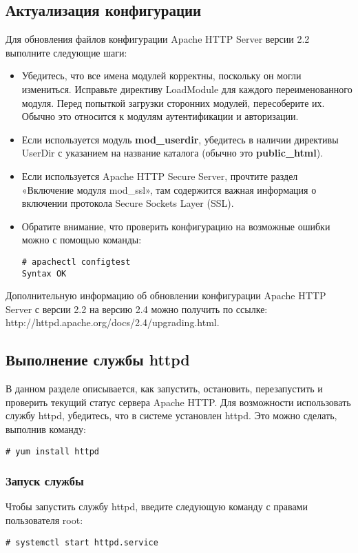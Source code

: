 \documentclass[a4paper,10pt,twoside]{article}
\begin{document}
\subsection{Актуализация конфигурации}
Для обновления файлов конфигурации Apache HTTP Server версии 2.2 выполните следующие шаги:
\begin{itemize}
 \item Убедитесь, что все имена модулей корректны, поскольку он могли измениться. Исправьте директиву LoadModule для каждого переименованного модуля.
Перед попыткой загрузки сторонних модулей, пересоберите их. Обычно это относится к модулям аутентификации и авторизации.
\item Если используется модуль \textbf{mod\_userdir}, убедитесь в наличии директивы UserDir с указанием на название каталога (обычно это \textbf{public\_html}).
\item Если используется Apache HTTP Secure Server, прочтите раздел «Включение модуля mod\_ssl», там содержится важная информация о включении протокола Secure Sockets Layer (SSL).
\item Обратите внимание, что проверить конфигурацию на возможные ошибки можно с помощью команды:
\begin{verbatim}
# apachectl configtest
Syntax OK
\end{verbatim} 
\end{itemize}



Дополнительную информацию об обновлении конфигурации Apache HTTP Server с версии 2.2 на версию 2.4 можно получить по ссылке:\\
http://httpd.apache.org/docs/2.4/upgrading.html.



\subsection{Выполнение службы httpd}

В данном разделе описывается, как запустить, остановить, перезапустить и проверить текущий статус сервера Apache HTTP. Для возможности использовать службу httpd, убедитесь, что в системе установлен httpd. Это можно сделать, выполнив команду:
\begin{verbatim}
# yum install httpd
\end{verbatim} 


\subsubsection{Запуск службы}
Чтобы запустить службу httpd, введите следующую команду  с правами пользователя root: 
\begin{verbatim}
# systemctl start httpd.service
\end{verbatim} 
\end{document}
